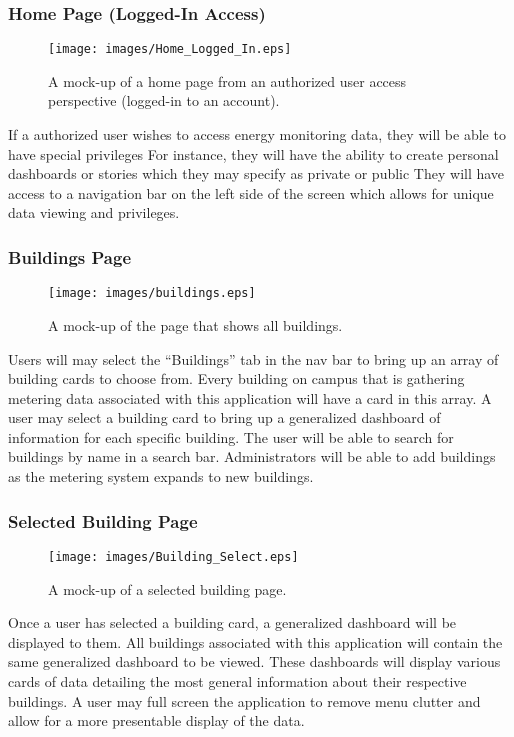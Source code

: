 \documentclass[journal,10pt,onecolumn,compsoc]{IEEEtran}
\begin{document}
	\subsubsection{Home Page (Logged-In Access)}
    \begin{figure}[H]
        \centering
        \texttt{[image: images/Home\_Logged\_In.eps]}
        \caption{A mock-up of a home page from an authorized user access perspective (logged-in to an account).}
    \end{figure}
	If a authorized user wishes to access energy monitoring data, they will be able to have special privileges 
	For instance, they will have the ability to create personal dashboards or stories which they may specify as private or public
	They will have access to a navigation bar on the left side of the screen which allows for unique data viewing and privileges. 
	
	
    \subsubsection{Buildings Page} 
    \begin{figure}[H]
        \centering
        \texttt{[image: images/buildings.eps]}
        \caption{A mock-up of the page that shows all buildings.}
    \end{figure}
	Users will may select the ``Buildings'' tab in the nav bar to bring up an array of building cards to choose from.
	Every building on campus that is gathering metering data associated with this application will have a card in this array.
	A user may select a building card to bring up a generalized dashboard of information for each specific building. 
	The user will be able to search for buildings by name in a search bar. Administrators will be able to add buildings
	as the metering system expands to new buildings.
	
    \subsubsection{Selected Building Page}
    \begin{figure}[H]
        \centering
        \texttt{[image: images/Building\_Select.eps]}
        \caption{A mock-up of a selected building page.}
    \end{figure}
	Once a user has selected a building card, a generalized dashboard will be displayed to them.
	All buildings associated with this application will contain the same generalized dashboard to be viewed.
	These dashboards will display various cards of data detailing the most general information about their respective buildings.
	A user may full screen the application to remove menu clutter and allow for a more presentable display of the data.
	
\end{document}
